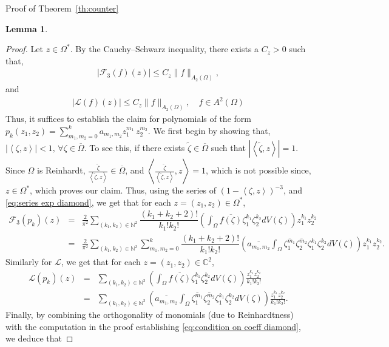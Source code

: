 \documentclass[11pt, oneside, reqno]{amsart}
\numberwithin{equation}{section}
\newtheorem{lemma}[theorem]{Lemma}
\theoremstyle{definition}
\newcommand{\beas}{\begin{eqnarray*}}
\newcommand{\eeas}{\end{eqnarray*}}
\newcommand{\C}{\mathbb C}
\newcommand{\N}{\mathbb N}
\newcommand{\F}{\mathcal F}
\newcommand{\ltt}{\left(}
\newcommand{\rtt}{\right)}
\newcommand{\Om}{\Omega}
\begin{document}
{\begin{section}{Proof of Theorem~\ref{th:counter}}
\begin{lemma}
\begin{itemize}
      \end{itemize}
      \end{lemma}
      \begin{proof}
        Let $z\in\Om^*$. By the Cauchy--Schwarz inequality, there exists a $C_z>0$ such that,
        \beas
        \left|\F_3\ltt f\rtt(z)\right|\leq C_z \|f\|_{A_2\ltt\Om\rtt},
        \eeas
        and
        \beas
         \left|\mathcal L\ltt f\rtt(z)\right|\leq C_z \|f\|_{A_2\ltt\Om\rtt},\quad f\in A^2(\Om)
        \eeas
        Thus, it suffices to establish the claim for polynomials of the form 
    $
    p_k\ltt z_1,z_2\rtt=\sum\limits_{m_1,m_2=0}^k a_{m_1,m_2}z_1^{m_1}\,z_2^{m_2}.
    $
    We first begin by showing that, $\left|\left\langle\zeta,z\right\rangle\right|< 1,\,\forall\zeta\in\overline{\Om}$. To see this, if there exists $\widetilde\zeta\in\overline{\Om}$ such that $\left|\left\langle\widetilde \zeta,z\right\rangle\right|=1$. Since $\Om$ is Reinhardt, $\frac{\widetilde{\zeta}}{\left\langle\widetilde \zeta,z\right\rangle}\in\overline \Om$, and $\left\langle\frac{\widetilde{\zeta}}{\left\langle\widetilde \zeta,z\right\rangle},z\right\rangle=1$, which is not possible since, $z\in \Om^*$, which proves our claim. Thus, using the series  of $\ltt1-\left\langle\zeta,z\right\rangle\rtt^{-3}$, and \eqref{eq:series exp diamond}, we get that for each $z=(z_1,z_2)\in\Om^*$,
           \beas
      \mathcal F_3\ltt p_k\rtt(z)&=&\frac{2}{\pi^2}\sum_{(k_1,k_2)\in\N^2} \dfrac{\ltt k_1+k_2+2\rtt!}{k_1!k_2!} \ltt \int_\Om \overline {f\ltt\zeta\rtt} \zeta_1^{k_1}\zeta_2^{k_2} dV(\zeta)\rtt z_1^{k_1} z_2^{k_2}\\ 
      &=&\frac{2}{\pi^2}\sum_{(k_1,k_2)\in\N^2}\sum\limits_{m_1,m_2=0}^k \dfrac{\ltt k_1+k_2+2\rtt!}{k_1!k_2!} \ltt \overline{a_{m_1,m_2}}\int_\Om \overline{\zeta_1^{m_1}}\overline{\zeta_2^{m_2}}\zeta_1^{k_1}\zeta_2^{k_2} dV(\zeta)\rtt z_1^{k_1} z_2^{k_2}.
      \eeas
      Similarly for $\mathcal L$, we get that for each $z=(z_1,z_2)\in\C^2$,
      \beas
      \mathcal L(p_k)(z)&=&\sum\limits_{(k_1,k_2)\in\N^2} \ltt \int_\Om \overline {f\ltt\zeta\rtt} \zeta_1^{k_1}\zeta_2^{k_2} dV(\zeta)\rtt\frac{z_1^{k_1}z_2^{k_2}}{k_1!k_2!}\\
      &=&\sum\limits_{(k_1,k_2)\in\N^2}\ltt \overline{a_{m_1,m_2}}\int_\Om \overline{\zeta_1^{m_1}}\overline{\zeta_2^{m_2}}\zeta_1^{k_1}\zeta_2^{k_2} dV(\zeta) \rtt\frac{z_1^{k_1}z_2^{k_2}}{k_1!k_2!}. 
      \eeas
     {Finally, by combining the orthogonality of monomials (due to Reinhardtness) with the computation in the proof establishing \eqref{eq:condition on coeff diamond}, we deduce that}

\end{proof}
\end{section}}
\end{document}
